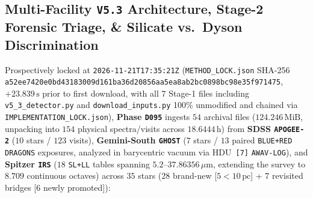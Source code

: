 \documentclass[twocolumn,10pt]{article}
\begin{document}
\subsection{Multi-Facility \texttt{V5.3} Architecture, Stage-2 Forensic Triage, \& Silicate vs.\ Dyson Discrimination}
Prospectively locked at \texttt{2026-11-21T17:35:21Z} (\texttt{METHOD\_LOCK.json} SHA-256 \texttt{a52ee742\allowbreak 0e0bd431\allowbreak 83009d16\allowbreak 1ba36d20\allowbreak 856aa5ea\allowbreak 8ab2bc08\allowbreak 98bc98e3\allowbreak 5f971475}, $+23.839\,\text{s}$ prior to first download, with all 7 Stage-1 files including \texttt{v5\_3\_detector.py} and \texttt{download\_inputs.py} 100\% unmodified and chained via \texttt{IMPLEMENTATION\_LOCK.json}), \textbf{Phase \texttt{D095}} ingests $54$ archival files ($124.246\,\text{MiB}$, unpacking into $154$ physical spectra/visits across $18.6444\,\text{h}$) from \textbf{SDSS \texttt{APOGEE-2}} ($10$ stars / $123$ visits), \textbf{Gemini-South \texttt{GHOST}} ($7$ stars / $13$ paired \texttt{BLUE+RED} \texttt{DRAGONS} exposures, analyzed in barycentric vacuum via HDU~\texttt{[7]} \texttt{AWAV-LOG}), and \textbf{Spitzer \texttt{IRS}} ($18$ \texttt{SL+LL} tables spanning $5.2\text{--}37.86356\,\mu\text{m}$, extending the survey to $8.709$ continuous octaves) across $35$ stars ($28$ brand-new [$5 < 10\,\text{pc}$] + $7$ revisited bridges [$6$ newly promoted]):
\end{document}
